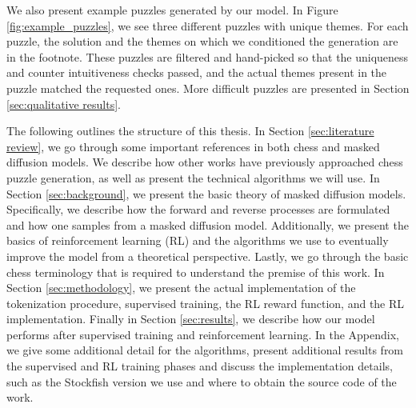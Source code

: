 
We also present example puzzles generated by our model. In Figure \ref{fig:example_puzzles}, we see three different puzzles with unique themes. For each puzzle, the solution and the themes on which we conditioned the generation are in the footnote. These puzzles are filtered and hand-picked so that the uniqueness and counter intuitiveness checks passed, and the actual themes present in the puzzle matched the requested ones. More difficult puzzles are presented in Section \ref{sec:qualitative results}.

The following outlines the structure of this thesis. In Section \ref{sec:literature review}, we go through some important references in both chess and masked diffusion models. We describe how other works have previously approached chess puzzle generation, as well as present the technical algorithms we will use. In Section \ref{sec:background}, we present the basic theory of masked diffusion models. Specifically, we describe how the forward and reverse processes are formulated and how one samples from a masked diffusion model. Additionally, we present the basics of reinforcement learning (RL) and the algorithms we use to eventually improve the model from a theoretical perspective. Lastly, we go through the basic chess terminology that is required to understand the premise of this work. In Section \ref{sec:methodology}, we present the actual implementation of the tokenization procedure, supervised training, the RL reward function, and the RL implementation. Finally in Section \ref{sec:results}, we describe how our model performs after supervised training and reinforcement learning. In the Appendix, we give some additional detail for the algorithms, present additional results from the supervised and RL training phases and discuss the implementation details, such as the Stockfish version we use and where to obtain the source code of the work.
